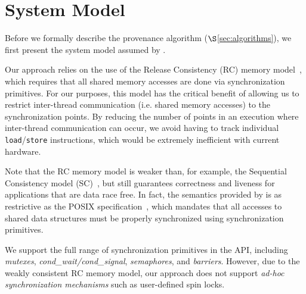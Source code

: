 \section{System Model}
\label{sec:model}

Before we formally describe the provenance algorithm ($\S$\ref{sec:algorithms}),  we first present the system model assumed by \projecttitle.%

 Our approach relies on the use of the
Release Consistency (RC) memory model~\cite{DSM-RC}, which requires that all shared memory accesses are done via synchronization primitives. For our purposes, this model has the critical
benefit of allowing us to restrict inter-thread communication (i.e. shared
memory accesses) to the synchronization points. By reducing the number of 
points in an execution where inter-thread communication can occur, we avoid
having to track individual {\tt load}/{\tt store} instructions, 
which would be extremely inefficient with current hardware. 


Note that the RC memory model is weaker
than, for example, the Sequential Consistency model (SC)~\cite{scLamport}, but
still guarantees correctness and liveness for applications that are data race
free. In fact,  the semantics provided by
\projecttitle is as restrictive as the POSIX specification~\cite{pthreads-spec}, which mandates that all accesses to shared data structures must be properly synchronized using 
\pthreads synchronization primitives. 

 We support the full range of synchronization
primitives in the \pthreads API, including {\em mutexes}, {\em cond\_wait/cond\_signal}, {\em semaphores},  and {\em
barriers}. However, due to the weakly consistent RC memory model, our approach
does not support {\em ad-hoc synchronization mechanisms} such as user-defined spin locks. 
